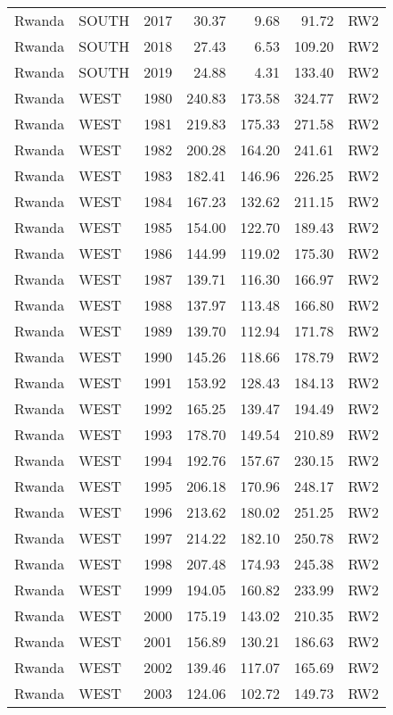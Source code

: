 \begin{longtable}{lllrrrl}
  Rwanda & SOUTH & 2017 & 30.37 & 9.68 & 91.72 & RW2 \\ 
  Rwanda & SOUTH & 2018 & 27.43 & 6.53 & 109.20 & RW2 \\ 
  Rwanda & SOUTH & 2019 & 24.88 & 4.31 & 133.40 & RW2 \\ 
  Rwanda & WEST & 1980 & 240.83 & 173.58 & 324.77 & RW2 \\ 
  Rwanda & WEST & 1981 & 219.83 & 175.33 & 271.58 & RW2 \\ 
  Rwanda & WEST & 1982 & 200.28 & 164.20 & 241.61 & RW2 \\ 
  Rwanda & WEST & 1983 & 182.41 & 146.96 & 226.25 & RW2 \\ 
  Rwanda & WEST & 1984 & 167.23 & 132.62 & 211.15 & RW2 \\ 
  Rwanda & WEST & 1985 & 154.00 & 122.70 & 189.43 & RW2 \\ 
  Rwanda & WEST & 1986 & 144.99 & 119.02 & 175.30 & RW2 \\ 
  Rwanda & WEST & 1987 & 139.71 & 116.30 & 166.97 & RW2 \\ 
  Rwanda & WEST & 1988 & 137.97 & 113.48 & 166.80 & RW2 \\ 
  Rwanda & WEST & 1989 & 139.70 & 112.94 & 171.78 & RW2 \\ 
  Rwanda & WEST & 1990 & 145.26 & 118.66 & 178.79 & RW2 \\ 
  Rwanda & WEST & 1991 & 153.92 & 128.43 & 184.13 & RW2 \\ 
  Rwanda & WEST & 1992 & 165.25 & 139.47 & 194.49 & RW2 \\ 
  Rwanda & WEST & 1993 & 178.70 & 149.54 & 210.89 & RW2 \\ 
  Rwanda & WEST & 1994 & 192.76 & 157.67 & 230.15 & RW2 \\ 
  Rwanda & WEST & 1995 & 206.18 & 170.96 & 248.17 & RW2 \\ 
  Rwanda & WEST & 1996 & 213.62 & 180.02 & 251.25 & RW2 \\ 
  Rwanda & WEST & 1997 & 214.22 & 182.10 & 250.78 & RW2 \\ 
  Rwanda & WEST & 1998 & 207.48 & 174.93 & 245.38 & RW2 \\ 
  Rwanda & WEST & 1999 & 194.05 & 160.82 & 233.99 & RW2 \\ 
  Rwanda & WEST & 2000 & 175.19 & 143.02 & 210.35 & RW2 \\ 
  Rwanda & WEST & 2001 & 156.89 & 130.21 & 186.63 & RW2 \\ 
  Rwanda & WEST & 2002 & 139.46 & 117.07 & 165.69 & RW2 \\ 
  Rwanda & WEST & 2003 & 124.06 & 102.72 & 149.73 & RW2 \\ 

\end{longtable}
